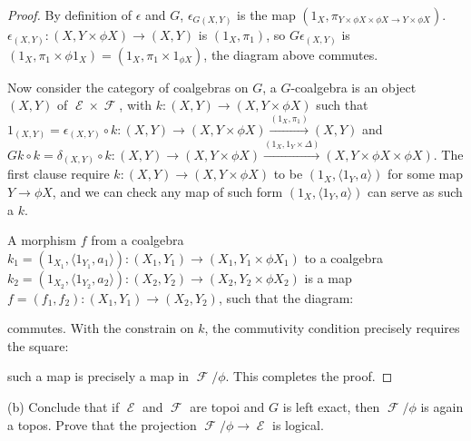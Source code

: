 \documentclass[a4paper]{article}
\DeclareMathOperator{\E}{\mathcal E}
\DeclareMathOperator{\F}{\mathcal F}
\begin{document}
\begin{proof}
    By definition of $\epsilon$ and $G$, $\epsilon_{G(X,Y)}$ is the map $(1_X,\pi_{Y\times \phi X\times \phi X\to Y\times \phi X})$. $\epsilon_{(X,Y)}:(X, Y\times \phi X)\to (X,Y)$ is $(1_X,\pi_1)$, so $G\epsilon_{(X,Y)}$ is $(1_X,\pi_1\times \phi 1_X)=(1_X,\pi_1\times 1_{\phi X})$, the diagram above commutes.

    Now consider the category of coalgebras on $G$, a $G$-coalgebra is an object $(X,Y)$ of $\E\times \F$, with $k:(X,Y)\to (X,Y\times \phi X)$ such that $1_{(X,Y)}=\epsilon_{(X,Y)}\circ k:(X,Y)\to (X,Y\times \phi X)\overset{(1_X,\pi_1)}\to (X,Y)$ and $Gk\circ k=\delta_{(X,Y)}\circ k:(X,Y)\to (X,Y\times \phi X)\overset{(1_X,1_Y\times \Delta)}\to  (X,Y\times \phi X\times \phi X)$. The first clause require $k:(X,Y)\to (X,Y\times \phi X)$ to be $(1_X,\langle 1_Y, a\rangle)$ for  some map $Y\to \phi X$, and we can check any map of such form $(1_X,\langle 1_Y, a\rangle)$ can serve as such a $k$.

    A morphism $f$ from a coalgebra $k_1=(1_{X_1},\langle 1_{Y_1},a_1\rangle):(X_1,Y_1)\to (X_1,Y_1\times \phi X_1)$  to a coalgebra $k_2=(1_{X_2},\langle 1_{Y_2},a_2\rangle ):(X_2,Y_2)\to (X_2,Y_2\times \phi X_2)$ is a map $f=(f_1,f_2):(X_1,Y_1)\to (X_2,Y_2)$, such that the diagram:
    \begin{center}
    \end{center}

    commutes. With the constrain on $k$, the commutivity condition precisely requires the square:

    \begin{center}
    \end{center}

    such a map is precisely a map in $\F/\phi$. This completes the proof.
\end{proof}
(b) Conclude that if $\E$ and $\F$ are topoi and $G$ is left exact, then $\F/\phi$ is again a topos. Prove that the projection $\F/\phi\to \E$ is logical.
\end{document}

